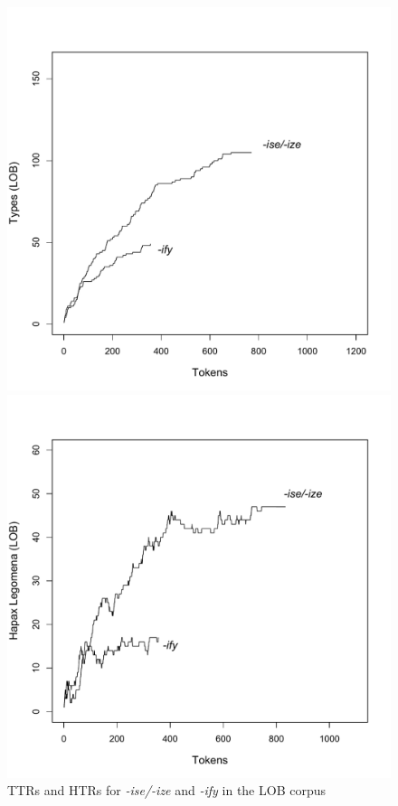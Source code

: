 \begin{figure}
\caption{TTRs and HTRs for \textit{-ise/-ize} and \textit{-ify} in the LOB corpus}
\label{fig:izettrhtr}
\begin{minipage}{.5\textwidth}
 \centering
 \includegraphics[width=\textwidth,trim=0 20 0 55]{figures/lobiseifytypes}
\end{minipage}%
\begin{minipage}{.5\textwidth}
 \centering
 \includegraphics[width=\textwidth,trim=0 20 0 55]{figures/lobiseifyhapaxes}
\end{minipage}
\end{figure}

